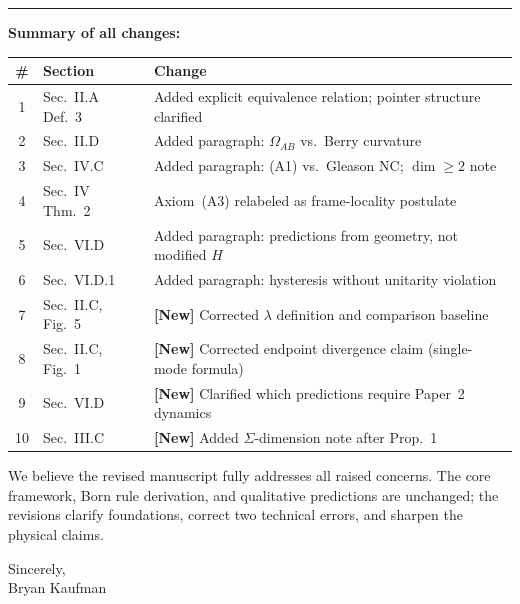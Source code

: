 \documentclass[12pt]{article}
\begin{document}
\bigskip\hrule\bigskip

\noindent\textbf{Summary of all changes:}

\medskip
\begin{tabular}{clp{7.5cm}}
\toprule
\# & Section & Change \\
\midrule
1 & Sec.~II.A Def.~3 & Added explicit equivalence relation; pointer structure clarified \\
2 & Sec.~II.D & Added paragraph: $\Omega_{AB}$ vs.\ Berry curvature \\
3 & Sec.~IV.C & Added paragraph: (A1) vs.\ Gleason NC; $\dim\geq 2$ note \\
4 & Sec.~IV Thm.~2 & Axiom~(A3) relabeled as frame-locality postulate \\
5 & Sec.~VI.D & Added paragraph: predictions from geometry, not modified $H$ \\
6 & Sec.~VI.D.1 & Added paragraph: hysteresis without unitarity violation \\
7 & Sec.~II.C, Fig.~5 & \textbf{[New]} Corrected $\lambda$ definition and comparison baseline \\
8 & Sec.~II.C, Fig.~1 & \textbf{[New]} Corrected endpoint divergence claim (single-mode formula) \\
9 & Sec.~VI.D & \textbf{[New]} Clarified which predictions require Paper~2 dynamics \\
10 & Sec.~III.C & \textbf{[New]} Added $\Sigma$-dimension note after Prop.~1 \\
\bottomrule
\end{tabular}

\medskip
\noindent We believe the revised manuscript fully addresses all raised concerns.
The core framework, Born rule derivation, and qualitative predictions are unchanged;
the revisions clarify foundations, correct two technical errors, and sharpen the
physical claims.

\bigskip
\noindent Sincerely,\\
Bryan Kaufman
\end{document}
